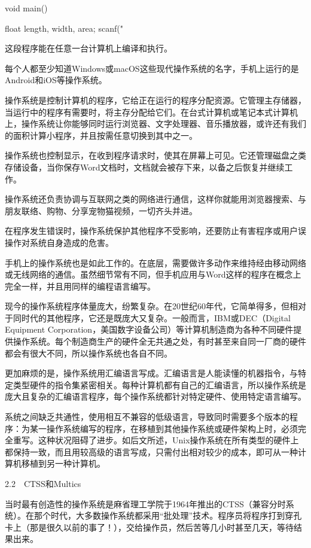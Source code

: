 \documentclass[a4paper,12pt,UTF8,twoside]{ctexbook}
\begin{document}
void main() { float length, width, area; scanf("%

这段程序能在任意一台计算机上编译和执行。

每个人都至少知道Windows或macOS这些现代操作系统的名字，手机上运行的是Android和iOS等操作系统。

操作系统是控制计算机的程序，它给正在运行的程序分配资源。它管理主存储器，当运行中的程序有需要时，将主存分配给它们。在台式计算机或笔记本式计算机上，操作系统让你能够同时运行浏览器、文字处理器、音乐播放器，或许还有我们的面积计算小程序，并且按需任意切换到其中之一。

操作系统也控制显示，在收到程序请求时，使其在屏幕上可见。它还管理磁盘之类存储设备，当你保存Word文档时，文档就会被存下来，以备之后恢复并继续工作。

操作系统还负责协调与互联网之类的网络进行通信，这样你就能用浏览器搜索、与朋友联络、购物、分享宠物猫视频，一切齐头并进。

在程序发生错误时，操作系统保护其他程序不受影响，还要防止有害程序或用户误操作对系统自身造成的危害。

手机上的操作系统也是如此工作的。在底层，需要做许多动作来维持经由移动网络或无线网络的通信。虽然细节常有不同，但手机应用与Word这样的程序在概念上完全一样，并且用同样的编程语言编写。

现今的操作系统程序体量庞大，纷繁复杂。在20世纪60年代，它简单得多，但相对于同时代的其他程序，它还是既庞大又复杂。一般而言，IBM或DEC（Digital Equipment Corporation，美国数字设备公司）等计算机制造商为各种不同硬件提供操作系统。每个制造商生产的硬件全无共通之处，有时甚至来自同一厂商的硬件都会有很大不同，所以操作系统也各自不同。

更加麻烦的是，操作系统用汇编语言写成。汇编语言是人能读懂的机器指令，与特定类型硬件的指令集紧密相关。每种计算机都有自己的汇编语言，所以操作系统是庞大且复杂的汇编语言程序，每个操作系统都针对特定硬件、使用特定语言编写。

系统之间缺乏共通性，使用相互不兼容的低级语言，导致同时需要多个版本的程序：为某一操作系统编写的程序，在移植到其他操作系统或硬件架构上时，必须完全重写。这种状况阻碍了进步。如后文所述，Unix操作系统在所有类型的硬件上都保持一致，而且用较高级的语言写成，只需付出相对较少的成本，即可从一种计算机移植到另一种计算机。





2.2　CTSS和Multics


当时最有创造性的操作系统是麻省理工学院于1964年推出的CTSS（兼容分时系统）。在那个时代，大多数操作系统都采用“批处理”技术。程序员将程序打到穿孔卡上（那是很久以前的事了！），交给操作员，然后苦等几小时甚至几天，等待结果出来。

}
\end{document}
